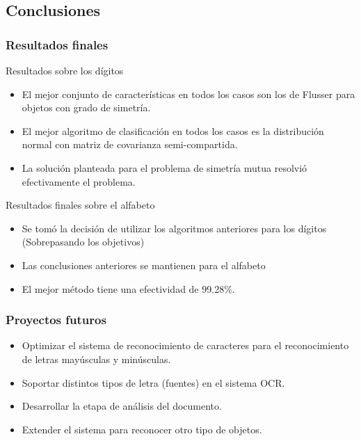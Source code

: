 \documentclass{beamer}
\begin{document}
	\subsection{Conclusiones}
	\begin{frame}
	\frametitle{Resultados finales}
	
	\begin{block}{Resultados sobre los dígitos}
	\begin{itemize}
	\item El mejor conjunto de características en todos los casos son los de Flusser para objetos con grado de simetría. \pause
	\item El mejor algoritmo de clasificación en todos los casos es la distribución normal con matriz de covarianza semi-compartida. \pause
	\item La solución planteada para el problema de simetría mutua resolvió efectivamente el problema. \pause
	\end{itemize}
	\end{block}
	
	\begin{block}{Resultados finales sobre el alfabeto}
	\begin{itemize}
	\item Se tomó la decisión de utilizar los algoritmos anteriores para los dígitos (Sobrepasando los objetivos) \pause
	\item Las conclusiones anteriores se mantienen para el alfabeto \pause
	\item El mejor método tiene una efectividad de 99.28\%.
	\end{itemize}
	\end{block}
	
	\end{frame}
	
	\begin{frame}
	\frametitle{Proyectos futuros}
	\begin{itemize}
	\item Optimizar el sistema de reconocimiento de caracteres para el reconocimiento de letras mayúsculas y minúsculas. \pause
	\item Soportar distintos tipos de letra (fuentes) en el sistema OCR. \pause
	\item Desarrollar la etapa de análisis del documento. \pause
	\item Extender el sistema para reconocer otro tipo de objetos.
	\end{itemize}
	\end{frame}
	
\end{document}
